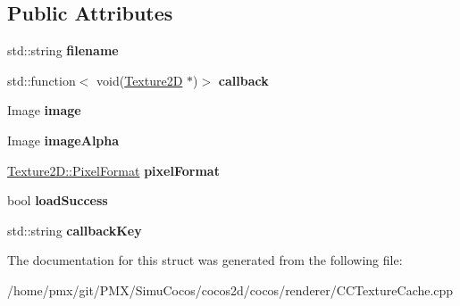 \subsection*{Public Attributes}
\begin{DoxyCompactItemize}
\item 
\mbox{\label{structTextureCache_1_1AsyncStruct_ac42d88e3243b514d1e9fe2861de21a56}} 
std\+::string {\bfseries filename}
\item 
\mbox{\label{structTextureCache_1_1AsyncStruct_a9ff6922643843dbb5c27484987749456}} 
std\+::function$<$ void(\hyperlink{classTexture2D}{Texture2D} $\ast$)$>$ {\bfseries callback}
\item 
\mbox{\label{structTextureCache_1_1AsyncStruct_a70918a1bb3af7f0075631ae467bb95b9}} 
Image {\bfseries image}
\item 
\mbox{\label{structTextureCache_1_1AsyncStruct_ab4eca58f871f3532e46ea005bd0f5c67}} 
Image {\bfseries image\+Alpha}
\item 
\mbox{\label{structTextureCache_1_1AsyncStruct_aa05bfeba4639e7a916f59447f16e6488}} 
\hyperlink{classTexture2D_a45d9d8bb5a0669def36bbdfbfb91d220}{Texture2\+D\+::\+Pixel\+Format} {\bfseries pixel\+Format}
\item 
\mbox{\label{structTextureCache_1_1AsyncStruct_a1907a29952cde43ac02dc3648c2363f5}} 
bool {\bfseries load\+Success}
\item 
\mbox{\label{structTextureCache_1_1AsyncStruct_acb34008ccbadf1ea445f4833f17f0dc7}} 
std\+::string {\bfseries callback\+Key}
\end{DoxyCompactItemize}


The documentation for this struct was generated from the following file\+:\begin{DoxyCompactItemize}
\item 
/home/pmx/git/\+P\+M\+X/\+Simu\+Cocos/cocos2d/cocos/renderer/C\+C\+Texture\+Cache.\+cpp\end{DoxyCompactItemize}
